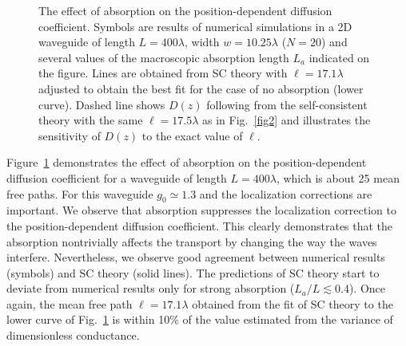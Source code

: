 \begin{figure}
\vskip -0.5cm
\vskip -0.7cm
\caption[The effect of absorption on the position-dependent diffusion coefficient.]{\label{fig3} The effect of absorption on the position-dependent diffusion coefficient. Symbols are results of numerical simulations in a 2D waveguide of length $L = 400\lambda$, width $w = 10.25 \lambda$ ($N = 20$) and several values of the macroscopic absorption length $L_a$ indicated on the figure. Lines are obtained from SC theory with $\ell = 17.1 \lambda$ adjusted to obtain the best fit for the case of no absorption (lower curve). Dashed line shows $D(z)$ following from the self-consistent theory with the same $\ell = 17.5 \lambda$ as in Fig.~\ref{fig2} and illustrates the sensitivity of $D(z)$ to the exact value of $\ell$.}
\end{figure}

Figure~\ref{fig3} demonstrates the effect of absorption on the position-dependent diffusion coefficient for a waveguide of length $L = 400\lambda$, which is about 25 mean free paths. For this waveguide $g_0 \simeq 1.3$ and the localization corrections are important. We observe that  absorption suppresses the localization correction to the position-dependent diffusion coefficient. This clearly demonstrates that the absorption nontrivially affects the transport by changing the way the waves interfere.
Nevertheless, we observe good agreement between numerical results (symbols) and SC theory (solid lines). The predictions of SC theory start to deviate from numerical results only for strong absorption ($L_a/L \lesssim 0.4$). Once again, the mean free path $\ell = 17.1 \lambda$ obtained from the fit of SC theory to the lower curve of Fig.~\ref{fig3} is within 10\% of the value estimated from the variance of dimensionless conductance.

